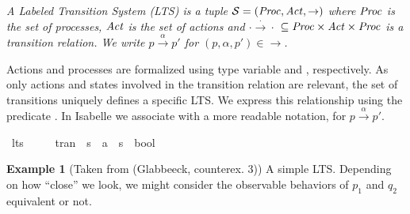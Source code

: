 \begin{isabellebody}
\begin{isamarkuptext}
\textit{A \textnormal{Labeled Transition System (LTS)} is a tuple $\mathcal{S} = (\mathit{Proc}, \mathit{Act}, \rightarrow)$ where $\mathit{Proc}$ is the set of processes, 
$\mathit{Act}$ is the set of actions and $\cdot\xrightarrow{\cdot}\cdot$ $\subseteq \mathit{Proc} \times \mathit{Act} \times \mathit{Proc}$ is a transition relation.
We write $p \xrightarrow{\alpha} p'$ for $(p, \alpha, p')\in \rightarrow$.}%
\end{isamarkuptext}\isamarkuptrue%
%
\begin{isamarkuptext}%
Actions and processes are formalized using type variable  and , respectively. As only actions and states involved in the transition relation are relevant, 
the set of transitions uniquely defines a specific LTS. We express this relationship using the predicate . In Isabelle we associate  with a more readable notation,  for $p \xrightarrow{\alpha} p'$.%
\end{isamarkuptext}\isamarkuptrue%
\isamarkupfalse%
\ lts\ {\isacharequal}{\kern0pt}\ \isanewline
\ \ \ tran\ {\isacharcolon}{\kern0pt}{\isacharcolon}{\kern0pt}\ {\isacartoucheopen}{\isacharprime}{\kern0pt}s\ {\isasymRightarrow}\ {\isacharprime}{\kern0pt}a\ {\isasymRightarrow}\ {\isacharprime}{\kern0pt}s\ {\isasymRightarrow}\ bool{\isacartoucheclose}\ \isanewline
\ \ \ \ {\isacharparenleft}{\kern0pt}{\isachardoublequoteopen}{\isacharunderscore}{\kern0pt}\ {\isasymmapsto}{\isacharunderscore}{\kern0pt}\ {\isacharunderscore}{\kern0pt}{\isachardoublequoteclose}\ {\isacharbrackleft}{\kern0pt}{}{}{\isacharcomma}{\kern0pt}\ {}{}{\isacharcomma}{\kern0pt}\ {}{}{\isacharbrackright}{\kern0pt}\ {}{}{\isacharparenright}{\kern0pt}\isanewline
{}%
\begin{isamarkuptext}%
\textbf{Example 1} (Taken from (Glabbeeck, counterex. 3)) A simple LTS. Depending on how ``close'' we look, we might consider the observable behaviors of $p_1$ and $q_2$ equivalent or not.%
\end{isamarkuptext}\isamarkuptrue%
%
\begin{isamarkuptext}%
\begin{figure}[htbp]
    \centering
{}
\end{figure}
\end{isamarkuptext}
\end{isabellebody}
